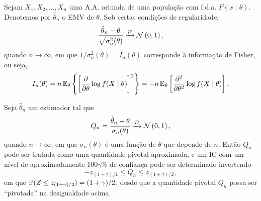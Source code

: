 \begin{theorem}
Sejam $X_1,X_2,\ldots,X_n$ uma A.A. oriunda de uma população com f.d.a. $F(x\mid\theta)$. Denotemos por $\hat{\theta}_n$ o EMV de $\theta$. Sob certas condições de regularidade,
\begin{equation}
\frac{\hat{\theta}_n-\theta}{\sqrt{\sigma_n^2(\theta)}} \toD \normdist{0,1},
\end{equation}
quando $n\to\infty$, em que $1/\sigma_n^2(\theta)=I_n(\theta)$ corresponde à informação de Fisher, ou seja,
\begin{equation}
I_n(\theta) = n\E_\theta\left\{\left[\frac{\partial}{\partial\theta}\log f(X\mid\theta)\right]^2\right\} = -n\E_\theta\left[\frac{\partial^2}{\partial\theta^2}\log f(X\mid\theta)\right].
\end{equation}
\end{theorem}

\begin{note}
Seja $\hat{\theta}_n$ um estimador tal que
\begin{equation}
Q_n = \frac{\hat{\theta}_n-\theta}{\sigma_n(\theta)} \toD \normdist{0,1},
\end{equation}
quando $n\to\infty$, em que $\sigma_n(\theta)$ é uma função de $\theta$ que depende de $n$. Então $Q_n$ pode ser tratada como uma quantidade pivotal aproximada, e um IC com um nível de aproximadamente $100\gamma\%$ de confiança pode ser determinado invertendo
\begin{equation}
-z_{(1+\gamma)/2} \leq Q_n \leq z_{(1+\gamma)/2},
\end{equation}
em que $\P(Z\leq z_{(1+\gamma)/2})=(1+\gamma)/2$, desde que a quantidade pivotal $Q_n$ possa ser ``pivotada'' na desigualdade acima.
\end{note}
